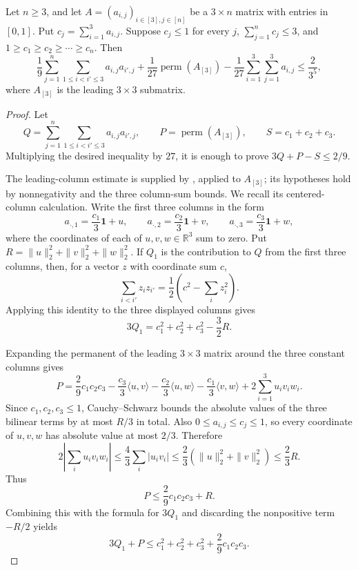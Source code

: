 \begin{lemma}
Let $n\ge 3$, and let $A=(a_{i,j})_{i\in[3],j\in[n]}$ be a $3\times n$
matrix with entries in $[0,1]$.  Put $c_j=\sum_{i=1}^3 a_{i,j}$.  Suppose
$c_j\le 1$ for every $j$, $\sum_{j=1}^n c_j\le 3$, and
$1\ge c_1\ge c_2\ge\cdots\ge c_n$.  Then
\[
\frac{1}{9}\sum_{j=1}^{n}\sum_{1\le i<i'\le3}a_{i,j}a_{i',j}
+\frac{1}{27}\operatorname{perm}(A_{[3]})
-\frac{1}{27}\sum_{i=1}^3\sum_{j=1}^3a_{i,j}
\le \frac{2}{3^5},
\]
where $A_{[3]}$ is the leading $3\times3$ submatrix.
\end{lemma}
\begin{proof}
Let
\[
Q=\sum_{j=1}^{n}\sum_{1\le i<i'\le3}a_{i,j}a_{i',j},\qquad
P=\operatorname{perm}(A_{[3]}),\qquad
S=c_1+c_2+c_3 .
\]
Multiplying the desired inequality by $27$, it is enough to prove
$3Q+P-S\le 2/9$.

The leading-column estimate is supplied by
, applied to $A_{[3]}$;
its hypotheses hold by nonnegativity and the three column-sum bounds.
We recall its centered-column calculation. Write the first three columns in the form
\[
a_{\cdot,1}=\frac{c_1}{3}\mathbf 1+u,\qquad
a_{\cdot,2}=\frac{c_2}{3}\mathbf 1+v,\qquad
a_{\cdot,3}=\frac{c_3}{3}\mathbf 1+w,
\]
where the coordinates of each of $u,v,w\in\mathbb R^3$ sum to zero.  Put
$R=\|u\|_2^2+\|v\|_2^2+\|w\|_2^2$.  If $Q_1$ is the contribution to $Q$ from
the first three columns, then, for a vector $z$ with coordinate sum $c$,
\[
\sum_{i<i'}z_iz_{i'}=\frac12\left(c^2-\sum_i z_i^2\right).
\]
Applying this identity to the three displayed columns gives
\[
3Q_1=c_1^2+c_2^2+c_3^2-\frac32R .
\]

Expanding the permanent of the leading $3\times3$ matrix around the three
constant columns gives
\[
P=\frac29c_1c_2c_3
-\frac{c_3}{3}\langle u,v\rangle
-\frac{c_2}{3}\langle u,w\rangle
-\frac{c_1}{3}\langle v,w\rangle
+2\sum_{i=1}^3u_iv_iw_i .
\]
Since $c_1,c_2,c_3\le1$, Cauchy--Schwarz bounds the absolute values of the
three bilinear terms by at most $R/3$ in total.  Also
$0\le a_{i,j}\le c_j\le1$, so every coordinate of $u,v,w$ has absolute value
at most $2/3$.  Therefore
\[
2\left|\sum_i u_iv_iw_i\right|
\le \frac43\sum_i|u_iv_i|
\le \frac23(\|u\|_2^2+\|v\|_2^2)
\le \frac23R .
\]
Thus
\[
P\le \frac29c_1c_2c_3+R.
\]
Combining this with the formula for $3Q_1$ and discarding the nonpositive term
$-R/2$ yields
\[
3Q_1+P\le c_1^2+c_2^2+c_3^2+\frac29c_1c_2c_3 .
\]


\end{proof}

